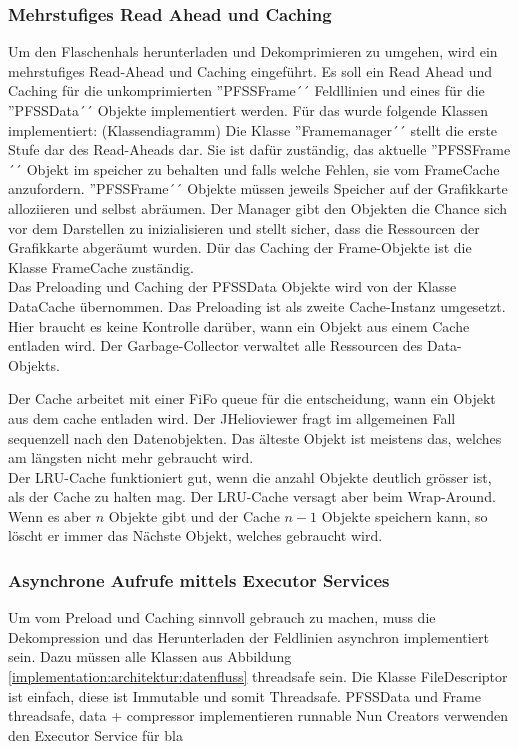 \subsubsection{Mehrstufiges Read Ahead und Caching}
Um den Flaschenhals herunterladen und Dekomprimieren zu umgehen, wird ein mehrstufiges Read-Ahead und Caching eingeführt. Es soll ein Read Ahead und Caching für die unkomprimierten ''PFSSFrame´´ Feldllinien und eines für die ''PFSSData´´ Objekte implementiert werden. Für das wurde folgende Klassen implementiert:
(Klassendiagramm)
Die Klasse ''Framemanager´´ stellt die erste Stufe dar des Read-Aheads dar. Sie ist dafür zuständig, das aktuelle ''PFSSFrame´´ Objekt im speicher zu behalten und falls welche Fehlen, sie vom FrameCache anzufordern. ''PFSSFrame´´ Objekte müssen jeweils Speicher auf der Grafikkarte alloziieren und selbst abräumen. Der Manager gibt den Objekten die Chance sich vor dem Darstellen zu inizialisieren und stellt sicher, dass die Ressourcen der Grafikkarte abgeräumt wurden. Dür das Caching der Frame-Objekte ist die Klasse FrameCache zuständig.\\
Das Preloading und Caching der PFSSData Objekte wird von der Klasse DataCache übernommen. Das Preloading ist als zweite Cache-Instanz umgesetzt. Hier braucht es keine Kontrolle darüber, wann ein Objekt aus einem Cache entladen wird. Der Garbage-Collector verwaltet alle Ressourcen des Data-Objekts. 

Der Cache arbeitet mit einer FiFo queue für die entscheidung, wann ein Objekt aus dem cache entladen wird. Der JHelioviewer fragt im allgemeinen Fall sequenzell nach den Datenobjekten. Das älteste Objekt ist meistens das, welches am längsten nicht mehr gebraucht wird.\\
Der LRU-Cache funktioniert gut, wenn die anzahl Objekte deutlich grösser ist, als der Cache zu halten mag. Der LRU-Cache versagt aber beim Wrap-Around. Wenn es aber $n$ Objekte gibt und der Cache $n-1$ Objekte speichern kann, so löscht er immer das Nächste Objekt, welches gebraucht wird. 

\subsubsection{Asynchrone Aufrufe mittels Executor Services}
Um vom Preload und Caching sinnvoll gebrauch zu machen, muss die Dekompression und das Herunterladen der Feldlinien asynchron implementiert sein. Dazu müssen alle Klassen aus Abbildung \ref{implementation:architektur:datenfluss} threadsafe sein.
Die Klasse FileDescriptor ist einfach, diese ist Immutable und somit Threadsafe.
PFSSData und Frame threadsafe, data + compressor implementieren runnable
Nun Creators verwenden den Executor Service für bla


